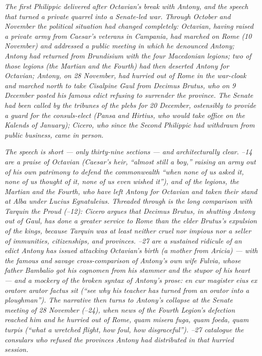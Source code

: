 
\textit{The first Philippic delivered after Octavian's break
with Antony, and the speech that turned a private quarrel into
a Senate-led war. Through October and November the political
situation had changed completely: Octavian, having raised a
private army from Caesar's veterans in Campania, had marched on
Rome (10 November) and addressed a public meeting in which he
denounced Antony; Antony had returned from Brundisium with the
four Macedonian legions; two of those legions (the Martian and
the Fourth) had then deserted Antony for Octavian; Antony, on
28 November, had hurried out of Rome in the war-cloak and
marched north to take Cisalpine Gaul from Decimus Brutus, who
on 9 December posted his famous edict refusing to surrender the
province. The Senate had been called by the tribunes of the
plebs for 20 December, ostensibly to provide a guard for the
consuls-elect (Pansa and Hirtius, who would take office on the
Kalends of January); Cicero, who since the Second Philippic
had withdrawn from public business, came in person.}

\textit{The speech is short --- only thirty-nine sections ---
and architecturally clear. --14 are a praise of
Octavian (Caesar's heir, ``almost still a boy,'' raising an
army out of his own patrimony to defend the commonwealth ``when
none of us asked it, none of us thought of it, none of us even
wished it''), and of the legions, the Martian and the Fourth,
who have left Antony for Octavian and taken their stand at Alba
under Lucius Egnatuleius. Threaded through is the long
comparison with Tarquin the Proud (--12): Cicero
argues that Decimus Brutus, in shutting Antony out of Gaul, has
done a greater service to Rome than the elder Brutus's
expulsion of the kings, because Tarquin was at least neither
cruel nor impious nor a seller of immunities, citizenships, and
provinces. --27 are a sustained ridicule of an
edict Antony has issued attacking Octavian's birth (a mother
from Aricia) --- with the famous and savage cross-comparison of
Antony's own wife Fulvia, whose father Bambalio got his
cognomen from his stammer and the stupor of his heart --- and a
mockery of the broken syntax of Antony's prose: \textit{en cur
magister eius ex oratore arator factus sit} (``see why his
teacher has turned from an orator into a ploughman''). The
narrative then turns to Antony's collapse at the Senate meeting
of 28 November (--24), when news of the Fourth
Legion's defection reached him and he hurried out of Rome,
\textit{quam misera fuga, quam foeda, quam turpis} (``what a
wretched flight, how foul, how disgraceful''). --27 catalogue the consulars who refused the provinces
Antony had distributed in that hurried session.}

